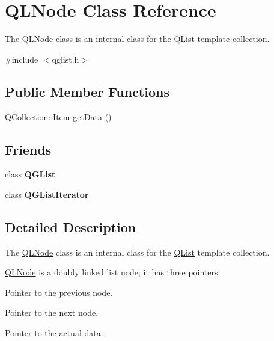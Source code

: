 \hypertarget{class_q_l_node}{}\section{Q\+L\+Node Class Reference}
\label{class_q_l_node}


The \mbox{\hyperlink{class_q_l_node}{Q\+L\+Node}} class is an internal class for the \mbox{\hyperlink{class_q_list}{Q\+List}} template collection.  




{\ttfamily \#include $<$qglist.\+h$>$}

\subsection*{Public Member Functions}
\begin{DoxyCompactItemize}
\item 
Q\+Collection\+::\+Item \mbox{\hyperlink{class_q_l_node_a7ed136ea4cd9729dd3b37bd904cc0e62}{get\+Data}} ()
\end{DoxyCompactItemize}
\subsection*{Friends}
\begin{DoxyCompactItemize}
\item 
\mbox{\label{class_q_l_node_a9bfde3c3259271cb86b87bd78b399dd5}} 
class {\bfseries Q\+G\+List}
\item 
\mbox{\label{class_q_l_node_a13dc100371e8931a394e57af8df9fbb3}} 
class {\bfseries Q\+G\+List\+Iterator}
\end{DoxyCompactItemize}


\subsection{Detailed Description}
The \mbox{\hyperlink{class_q_l_node}{Q\+L\+Node}} class is an internal class for the \mbox{\hyperlink{class_q_list}{Q\+List}} template collection. 

\mbox{\hyperlink{class_q_l_node}{Q\+L\+Node}} is a doubly linked list node; it has three pointers\+: 
\begin{DoxyEnumerate}
\item Pointer to the previous node. 
\item Pointer to the next node. 
\item Pointer to the actual data. 
\end{DoxyEnumerate}


